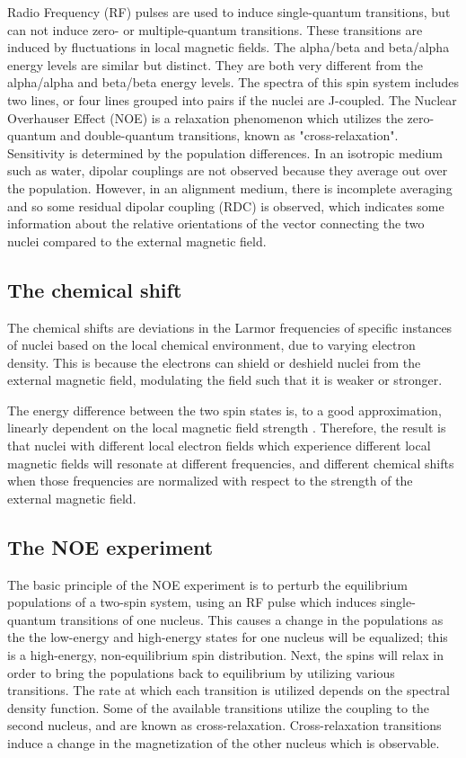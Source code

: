 Radio Frequency (RF) pulses are used to induce single-quantum transitions, 
but can not induce zero- or multiple-quantum transitions.  These transitions 
are induced by fluctuations in local magnetic fields.
The alpha/beta and beta/alpha energy levels are similar but distinct.  They are both
very different from the alpha/alpha and beta/beta energy levels.  The spectra of this
spin system includes two lines, or four lines grouped into pairs if the 
nuclei are J-coupled.
The Nuclear Overhauser Effect (NOE) is a relaxation phenomenon which utilizes 
the zero-quantum and double-quantum transitions, known as "cross-relaxation".
Sensitivity is determined by the population differences.
In an isotropic medium such as water, dipolar couplings are not observed
because they average out over the population.
However, in an alignment medium, there is incomplete averaging
and so some residual dipolar coupling (RDC) is observed, which indicates 
some information about the relative orientations of the vector connecting
the two nuclei compared to the external magnetic field.


\subsection*{The chemical shift}

The chemical shifts are deviations in the Larmor frequencies of specific 
instances of nuclei based on the local chemical environment, due to varying
electron density.  This is because the electrons can shield or deshield nuclei
from the external magnetic field, modulating the field such that it is weaker
or stronger.

The energy difference between the two spin states is, to a good approximation,
linearly dependent on the local magnetic field strength 
\cite{cavanagh1995protein}.  Therefore, the 
result is that nuclei with different local electron fields which experience
different local magnetic fields will resonate at different frequencies, and
different chemical shifts when those frequencies are normalized with respect
to the strength of the external magnetic field.


\subsection*{The NOE experiment}

The basic principle of the NOE experiment is to perturb the equilibrium 
populations of a two-spin system, using an RF pulse which induces single-quantum
transitions of one nucleus.  This causes a change in the populations as the
the low-energy and high-energy states for one nucleus will be equalized; this
is a high-energy, non-equilibrium spin distribution.  Next, the spins will relax
in order to bring the populations back to equilibrium by utilizing various 
transitions.  The rate at which each transition is utilized depends on the
spectral density function.  Some of the available transitions utilize the 
coupling to the second nucleus, and are known as cross-relaxation.  
Cross-relaxation transitions induce a change in the magnetization of the other
nucleus which is observable.

